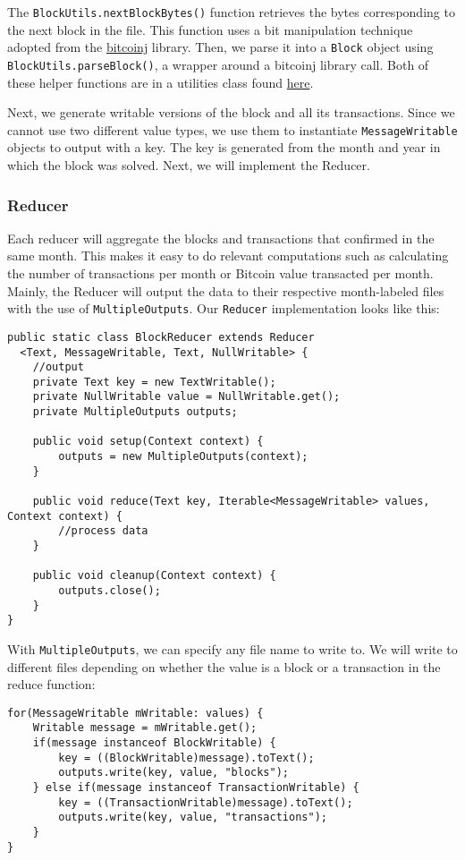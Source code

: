 \documentclass[9pt,twocolumn,twoside]{idsi}
\begin{document}
The \lstinline{BlockUtils.nextBlockBytes()} function retrieves the bytes corresponding to the next block in the file. This function uses a bit manipulation technique adopted from the \href{https://bitcoinj.github.io/}{bitcoinj} library. Then, we parse it into a \lstinline{Block} object using \lstinline{BlockUtils.parseBlock()}, a wrapper around a bitcoinj library call. Both of these helper functions are in a utilities class found \href{https://google.com}{here}.

Next, we generate writable versions of the block and all its transactions. Since we cannot use two different value types, we use them to instantiate \lstinline{MessageWritable} objects to output with a key. The key is generated from the month and year in which the block was solved. Next, we will implement the Reducer.

\subsubsection{Reducer}
Each reducer will aggregate the blocks and transactions that confirmed in the same month. This makes it easy to do relevant computations such as calculating the number of transactions per month or Bitcoin value transacted per month. Mainly, the Reducer will output the data to their respective month-labeled files with the use of \lstinline{MultipleOutputs}. Our \lstinline{Reducer} implementation looks like this:

\begin{lstlisting}
public static class BlockReducer extends Reducer
  <Text, MessageWritable, Text, NullWritable> {
    //output
    private Text key = new TextWritable();
    private NullWritable value = NullWritable.get();
    private MultipleOutputs outputs;

    public void setup(Context context) {
        outputs = new MultipleOutputs(context);
    }

    public void reduce(Text key, Iterable<MessageWritable> values, Context context) {
        //process data
    }

    public void cleanup(Context context) {
        outputs.close();
    }
}
\end{lstlisting}

With \lstinline{MultipleOutputs}, we can specify any file name to write to. We will write to different files depending on whether the value is a block or a transaction in the reduce function:

\begin{lstlisting}
for(MessageWritable mWritable: values) {
    Writable message = mWritable.get();
    if(message instanceof BlockWritable) {
        key = ((BlockWritable)message).toText();
        outputs.write(key, value, "blocks");
    } else if(message instanceof TransactionWritable) {
        key = ((TransactionWritable)message).toText();
        outputs.write(key, value, "transactions");
    }
}
\end{lstlisting}
\end{document}
